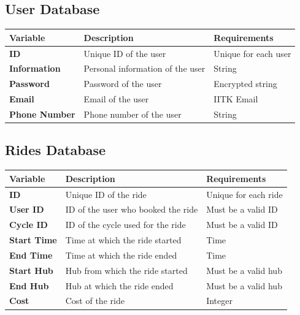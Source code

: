 \documentclass[11pt]{article}
\begin{document}
\appendixpageoff
\begin{appendices}
\newpage
\section{}

\subsection{User Database}
\begin{center}
\begin{tabular}{|>{\centering\arraybackslash}m{}|>{\centering\arraybackslash}m{}|>{\centering\arraybackslash}m{}|}
    \hline
    \textbf{Variable} & \textbf{Description} & \textbf{Requirements} \\
    \hline
    \textbf{ID} & Unique ID of the user &  Unique for each user\\
    \hline
    \textbf{Information} & Personal information of the user &  String\\
    \hline
    \textbf{Password} & Password of the user &  Encrypted string\\
    \hline
    \textbf{Email} & Email of the user &  IITK Email\\
    \hline
    \textbf{Phone Number} & Phone number of the user &  String\\
    \hline
\end{tabular}
\end{center}

\subsection{Rides Database}
\begin{center}
\begin{tabular}{|>{\centering\arraybackslash}m{}|>{\centering\arraybackslash}m{}|>{\centering\arraybackslash}m{}|}
    \hline
    \textbf{Variable} & \textbf{Description} & \textbf{Requirements} \\
    \hline
    \textbf{ID} & Unique ID of the ride &  Unique for each ride\\
    \hline
    \textbf{User ID} & ID of the user who booked the ride & Must be a valid ID\\
    \hline
    \textbf{Cycle ID} & ID of the cycle used for the ride & Must be a valid ID\\
    \hline
    \textbf{Start Time} & Time at which the ride started &  Time\\
    \hline
    \textbf{End Time} & Time at which the ride ended &  Time\\
    \hline
    \textbf{Start Hub} & Hub from which the ride started &  Must be a valid hub\\
    \hline
    \textbf{End Hub} & Hub at which the ride ended &  Must be a valid hub\\
    \hline
    \textbf{Cost} & Cost of the ride &  Integer\\
    \hline
\end{tabular}
\end{center}


\end{appendices}
\end{document}

